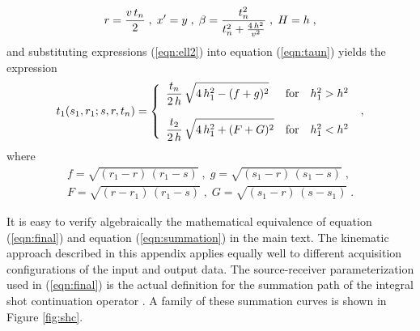 \begin{equation}
r={ {v\,t_n} \over 2}\;,\;x'=y\;,\;
\beta={t_n^2 \over {t_n^2+{{4\,h^2} \over v^2}}}\;,\;
H=h\;,
\label{eqn:ell2}
\end{equation}
and substituting expressions (\ref{eqn:ell2}) into equation (\ref{eqn:taun}) yields the
expression
\begin{equation}
t_1(s_1,r_1;s,r,t_n)=\left\{
        \begin{array}{lcr}\displaystyle{
{t_n \over {2\,h}}\,
\sqrt{4\,h_1^2-(f+g)^2}}
& \mbox{for} & h_1^2 > h^2 \\ & & \\ \displaystyle{
{t_2 \over {2\,h}}\,
\sqrt{4\,h_1^2+(F+G)^2}}
& \mbox{for} & h_1^2 < h^2
        \end{array}
        \right.\;, 
\label{eqn:final}
\end{equation}
where 
\begin{eqnarray}
f=\sqrt{(r_1-r)\,(r_1-s)}\;,\;g=\sqrt{(s_1-r)\,(s_1-s)}\;,
\nonumber \\
F=\sqrt{(r-r_1)\,(r_1-s)}\;,\;G=\sqrt{(s_1-r)\,(s-s_1)}\;.
\nonumber
\end{eqnarray}

It is easy to verify algebraically the mathematical equivalence of
equation (\ref{eqn:final}) and equation (\ref{eqn:summation}) in the
main text. The kinematic approach described in this appendix applies
equally well to different acquisition configurations of the input and
output data. The source-receiver parameterization used in
(\ref{eqn:final}) is the actual definition for the summation path of
the integral shot continuation operator
\cite[]{SEG-1993-0673,GEO61-06-18461858}. A family of these summation
curves is shown in Figure \ref{fig:shc}.



